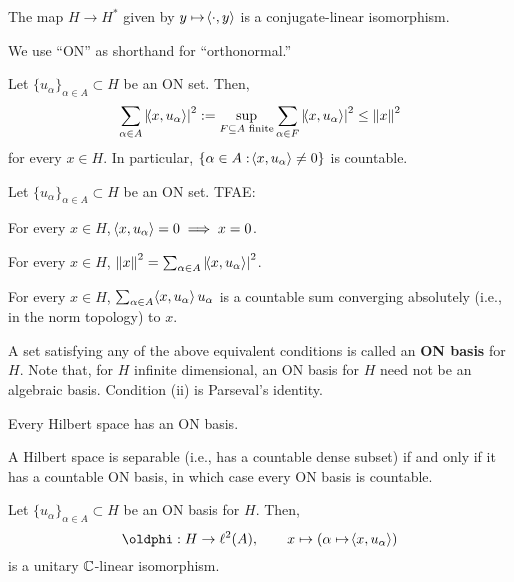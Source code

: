 \documentclass[11pt]{article}
\renewcommand{\phi}{\oldphi}
\begin{document}
\begin{theorem}
The map $H\to H^*$ given by $y\mapsto\!\left\langle\cdot,y\right\rangle$ is a conjugate-linear isomorphism.
\end{theorem}

We use ``ON'' as shorthand for ``orthonormal.''

\begin{theorem}
Let $\{u_{\alpha}\}_{\alpha\in A}\subset H$ be an ON set. Then,
$$\sum_{\alpha\in A}\left\lvert\!\left\langle x,u_{\alpha}\right\rangle\right\rvert^2:=\sup_{F\subseteq A\textup{ finite}}\sum_{\alpha\in F}\left\lvert\!\left\langle x,u_{\alpha}\right\rangle\right\rvert^2\leq\left\lVert x\right\rVert^2$$
for every $x\in H$. In particular, $\{\alpha\in A : \!\left\langle x,u_{\alpha}\right\rangle\neq0\}$ is countable.
\end{theorem}

\begin{theorem}
Let $\{u_{\alpha}\}_{\alpha\in A}\subset H$ be an ON set. TFAE:
\begin{enum}{\roman}
\item For every $x\in H$, $\!\left\langle x,u_{\alpha}\right\rangle=0\implies x=0$.

\item For every $x\in H$, $\left\lVert x\right\rVert^2=\sum_{\alpha\in A}\left\lvert\!\left\langle x,u_{\alpha}\right\rangle\right\rvert^2$.

\item For every $x\in H$, $\sum_{\alpha\in A}\!\left\langle x,u_{\alpha}\right\rangle u_{\alpha}$ is a countable sum converging absolutely (i.e., in the norm topology) to $x$.
\end{enum}
\end{theorem}

A set satisfying any of the above equivalent conditions is called an \textbf{ON basis} for $H$. Note that, for $H$ infinite dimensional, an ON basis for $H$ need not be an algebraic basis. Condition (ii) is Parseval's identity.

\begin{proposition}
Every Hilbert space has an ON basis.
\end{proposition}

\begin{proposition}
A Hilbert space is separable (i.e., has a countable dense subset) if and only if it has a countable ON basis, in which case every ON basis is countable.
\end{proposition}

\begin{proposition}
Let $\{u_{\alpha}\}_{\alpha\in A}\subset H$ be an ON basis for $H$. Then,
$$\phi: H\to\l^2(A),\qquad x\mapsto(\alpha\mapsto\ip{x,u_{\alpha}})$$
is a unitary $\mathbb{C}$-linear isomorphism.
\end{proposition}
\end{document}
